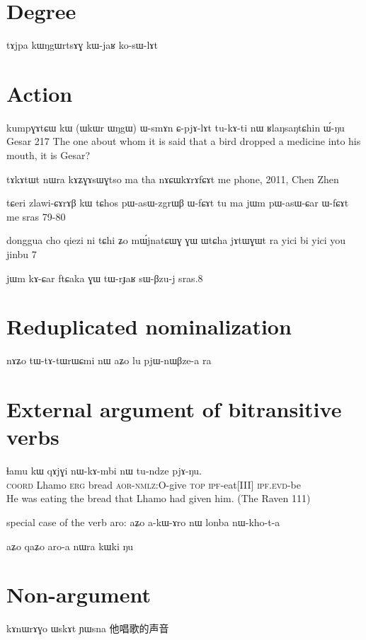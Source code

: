 \documentclass[oldfontcommands,oneside,a4paper,11pt]{memoir}
\newcommand{\ipa}[1]{{\phon #1}} %
\newcommand{\wav}[1]{}%
\newcommand{\aor}{\textsc{aor}}
\newcommand{\coord}{\textsc{coord}}
\newcommand{\erg}{\textsc{erg}}
\newcommand{\evd}{\textsc{evd}}
\newcommand{\ipf}{\textsc{ipf}}
\newcommand{\nmlz}{\textsc{nmlz}}
\newcommand{\topic}{\textsc{top}}
\begin{document}
\section{Degree}
tɤjpa kɯŋgɯrtsɤɣ kɯ-jaʁ ko-sɯ-lɤt

\section{Action}
kumpɣɤtɕɯ	kɯ	(ɯkɯr ɯŋgɯ) ɯ-smɤn	ɕ-pjɤ-lɤt	tu-kɤ-ti nɯ	ʁlaŋsaŋtɕhin	ɯ́-ŋu
Gesar 217
The one about whom it is said that a bird dropped a medicine into his mouth, it is Gesar?

tɤkɤtɯt nɯra kɤʑɣɤsɯɣtso ma tha nɤɕɯkɤrɤfɕɤt me
phone, 2011, Chen Zhen

tɕeri zlawi-ɕɤrɤβ kɯ tɕhos pɯ-asɯ-zgrɯβ ɯ-fɕɤt tu ma
 jɯm pɯ-asɯ-ɕar ɯ-fɕɤt me
sras 79-80

donggua cho qiezi ni tɕhi ʑo mɯ́jnatɕɯɣ ɣɯ ɯtɕha jɤtɯɣɯt ra
yici bi yici you jinbu 7

jɯm kɤ-ɕar ftɕaka ɣɯ tɯ-rɟaʁ sɯ-βzu-j 
sras.8

\section{Reduplicated nominalization}
nɤʑo tɯ-tɤ-tɯrɯɕmi nɯ aʑo lu pjɯ-nɯβze-a ra
\wav{ex-tWtAtWrWCmi}

\section{External argument of bitransitive verbs}  \label{sec:relativisation.external}

\begin{exe}
\ex
\gll      \ipa{tɕe} 	\ipa{ɬamu} 	\ipa{kɯ} 	\ipa{qɤjɣi} 	\ipa{nɯ-kɤ-mbi} 	\ipa{nɯ} 	\ipa{tu-ndze} 	\ipa{pjɤ-ŋu.}   \\
\coord{} Lhamo \erg{} bread \aor{}-\nmlz{}:O-give \topic{} \ipf{}-eat[III] \ipf.\evd{}-be  \\
 \glt    He was eating the bread that Lhamo had given him. (The Raven 111)
\end{exe} 



special case of the verb aro:
aʑo a-kɯ-ɤro nɯ lonba nɯ-kho-t-a

aʑo qaʑo aro-a nɯra kɯki ŋu
\wav{aro-relative} \wav{aro-relative2}
\section{Non-argument}
kɤnɯrɤɣo ɯskɤt ɲɯsna
他唱歌的声音
\end{document}
